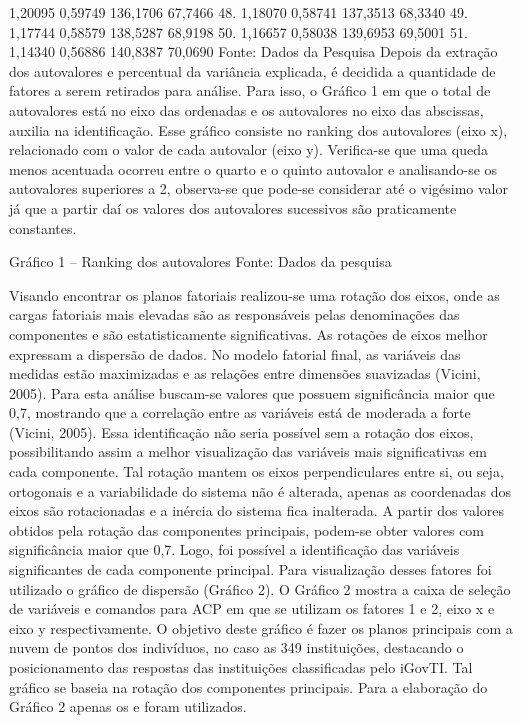 1,20095
0,59749
136,1706
67,7466
48. 
1,18070
0,58741
137,3513
68,3340
49. 
1,17744
0,58579
138,5287
68,9198
50. 
1,16657
0,58038
139,6953
69,5001
51. 
1,14340
0,56886
140,8387
70,0690
Fonte: Dados da Pesquisa
Depois da extração dos autovalores e percentual da variância explicada, é decidida a quantidade de fatores a serem retirados para análise. Para isso, o Gráfico 1 em que o total de autovalores está no eixo das ordenadas e os autovalores  no eixo das abscissas, auxilia na identificação. Esse gráfico consiste no ranking dos autovalores (eixo x), relacionado com o valor de cada autovalor (eixo y). Verifica-se que uma queda menos acentuada ocorreu entre o quarto e o quinto autovalor e analisando-se os autovalores superiores a 2, observa-se que pode-se considerar até o vigésimo valor já que a partir daí os valores dos autovalores sucessivos são praticamente constantes.
 
Gráfico 1 – Ranking dos autovalores
Fonte: Dados da pesquisa

Visando encontrar os planos fatoriais realizou-se uma rotação dos eixos, onde as cargas fatoriais mais elevadas são as responsáveis pelas denominações das componentes e são estatisticamente significativas. As rotações de eixos melhor expressam a dispersão de dados. No modelo fatorial final, as variáveis das medidas estão maximizadas e as relações entre dimensões suavizadas (Vicini, 2005).
Para esta análise buscam-se valores que possuem significância maior que 0,7, mostrando que a correlação entre as variáveis está de moderada a forte (Vicini, 2005). Essa identificação não seria possível sem a rotação dos eixos, possibilitando assim a melhor visualização das variáveis mais significativas em cada componente. Tal rotação mantem os eixos perpendiculares entre si, ou seja, ortogonais e a variabilidade do sistema não é alterada, apenas as coordenadas dos eixos são rotacionadas e a inércia do sistema fica inalterada. 
A partir dos valores obtidos pela rotação das componentes principais, podem-se obter valores com significância maior que 0,7. Logo, foi possível a identificação das variáveis significantes de cada componente principal.
Para visualização desses fatores foi utilizado o gráfico de dispersão (Gráfico 2). O Gráfico 2 mostra a caixa de seleção de variáveis e comandos para ACP em que se utilizam os fatores 1 e 2, eixo x e eixo y respectivamente. O objetivo deste gráfico é fazer os planos principais com a nuvem de pontos dos indivíduos, no caso as 349 instituições, destacando o posicionamento das respostas das instituições classificadas pelo iGovTI. Tal gráfico se baseia na rotação dos componentes principais. Para a elaboração do Gráfico 2 apenas os  e  foram utilizados.
 
